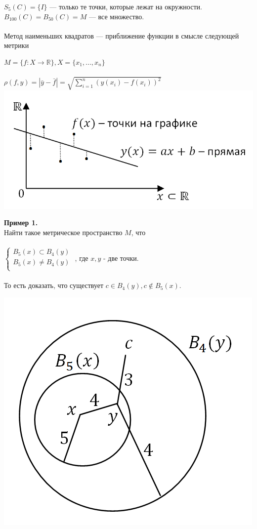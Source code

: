 \documentclass[a4paper,12pt]{article}
\begin{document}
\begin{defintion}
$S_5(C) = \{ I \}$ --- только те точки, которые лежат на окружности. \\
$B_{100}(C) = B_{50} (C) = M $ --- все множество. \\
\\
Метод наименьших квадратов --- приближение функции в смысле следующей метрики \begin{center} $M = \{f: X \rightarrow \mathbb{R} \}, X = \{ x_1, ..., x_n \}$\\ ~\\
	$\rho (f, y) = |\bar y - \bar f| = \sqrt{\sum\limits_{i=1}^n(y(x_i)-f(x_i))^2}$ \\
	\includegraphics[scale=0.6]{l4_4.png}\end{center}
\noindent \textbf{Пример 1.}\\
Найти такое метрическое пространство $M$, что\\ \\
$  
\left\{  
\begin{array}{lcl}  
B_5(x) \subset B_4(y) \\  
B_5(x) \neq B_4(y)\\
\end{array}   
\right.  
$
, где $x, y$ - две точки. \\ \\То есть доказать, что существует $c\in B_4(y), c\notin B_5(x)$.\begin{center}
	\includegraphics[scale=0.5]{l4_5.png}\\

\end{center}
\end{defintion}
\end{document}
